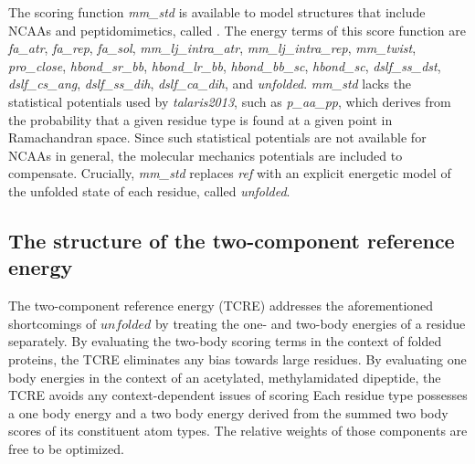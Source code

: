 The scoring function \textit{mm\_std} is available to model structures that include NCAAs and peptidomimetics, called \cite{renfrew_incorporation_2012}.
The energy terms of this score function are \textit{fa\_atr}, \textit{fa\_rep}, \textit{fa\_sol}, \textit{mm\_lj\_intra\_atr}, \textit{mm\_lj\_intra\_rep}, \textit{mm\_twist}, \textit{pro\_close}, \textit{hbond\_sr\_bb}, \textit{hbond\_lr\_bb}, \textit{hbond\_bb\_sc}, \textit{hbond\_sc}, \textit{dslf\_ss\_dst}, \textit{dslf\_cs\_ang}, \textit{dslf\_ss\_dih}, \textit{dslf\_ca\_dih}, and \textit{unfolded}.
\textit{mm\_std} lacks the statistical potentials used by \textit{talaris2013}, such as \textit{p\_aa\_pp}, which derives from the probability that a given residue type is found at a given point in Ramachandran space.
Since such statistical potentials are not available for NCAAs in general, the molecular mechanics potentials are included to compensate.
Crucially, \textit{mm\_std} replaces \textit{ref} with an explicit energetic model of the unfolded state of each residue, called \textit{unfolded}.

\subsection{The structure of the two-component reference energy}
The two-component reference energy (TCRE) addresses the aforementioned shortcomings of $unfolded$ by treating the one- and two-body energies of a residue separately.
By evaluating the two-body scoring terms in the context of folded proteins, the TCRE eliminates any bias towards large residues.
By evaluating one body energies in the context of an acetylated, methylamidated dipeptide, the TCRE avoids any context-dependent issues of scoring
Each residue type possesses a one body energy and a two body energy derived from the summed two body scores of its constituent atom types.
The relative weights of those components are free to be optimized.

